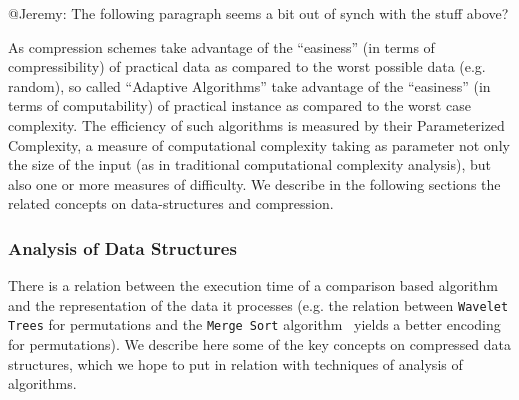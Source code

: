 \documentclass[a4paper,10pt]{article}
\begin{document}
\begin{TODO}
\begin{STEFAN}
@Jeremy: The following paragraph seems a bit out of synch with the stuff above?
\end{STEFAN}
\end{TODO}
As compression schemes take advantage of the ``easiness'' (in terms of compressibility) of practical data as compared to the worst possible data (e.g. random), so called ``Adaptive Algorithms'' take advantage of the ``easiness'' (in terms of computability) of practical instance as compared to the worst case complexity. The efficiency of such algorithms is measured by their Parameterized Complexity, a measure of computational complexity taking as parameter not only the size of the input (as in traditional computational complexity analysis), but also one or more measures of difficulty. We describe in the following sections the related concepts on data-structures and compression.


\subsubsection{Analysis of Data Structures}
\label{sec:dataStructures}

There is a relation between the execution time of a comparison based algorithm and the representation of the data it processes (e.g.  the relation between \texttt{Wavelet Trees} for permutations and the \texttt{Merge Sort} algorithm~\cite{2013-TCS-CompressedRepresentationsOfPermutationsAndApplications-BarbayNavarro} yields a better encoding for permutations). We describe here some of the key concepts on compressed data structures, which we hope to put in relation with techniques of analysis of algorithms.
\end{document}
